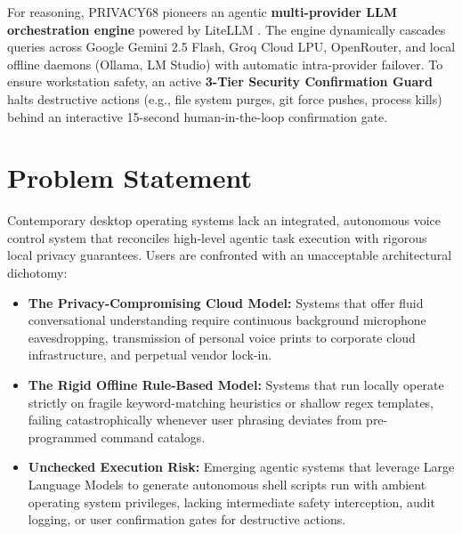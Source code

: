 For reasoning, PRIVACY68 pioneers an agentic \textbf{multi-provider LLM orchestration engine} powered by LiteLLM \cite{litellm2024}. The engine dynamically cascades queries across Google Gemini 2.5 Flash, Groq Cloud LPU, OpenRouter, and local offline daemons (Ollama, LM Studio) with automatic intra-provider failover. To ensure workstation safety, an active \textbf{3-Tier Security Confirmation Guard} halts destructive actions (e.g., file system purges, git force pushes, process kills) behind an interactive 15-second human-in-the-loop confirmation gate.

\section{Problem Statement}
Contemporary desktop operating systems lack an integrated, autonomous voice control system that reconciles high-level agentic task execution with rigorous local privacy guarantees. Users are confronted with an unacceptable architectural dichotomy:

\begin{itemize}
    \item \textbf{The Privacy-Compromising Cloud Model:} Systems that offer fluid conversational understanding require continuous background microphone eavesdropping, transmission of personal voice prints to corporate cloud infrastructure, and perpetual vendor lock-in.
    \item \textbf{The Rigid Offline Rule-Based Model:} Systems that run locally operate strictly on fragile keyword-matching heuristics or shallow regex templates, failing catastrophically whenever user phrasing deviates from pre-programmed command catalogs.
    \item \textbf{Unchecked Execution Risk:} Emerging agentic systems that leverage Large Language Models to generate autonomous shell scripts run with ambient operating system privileges, lacking intermediate safety interception, audit logging, or user confirmation gates for destructive actions.
\end{itemize}

